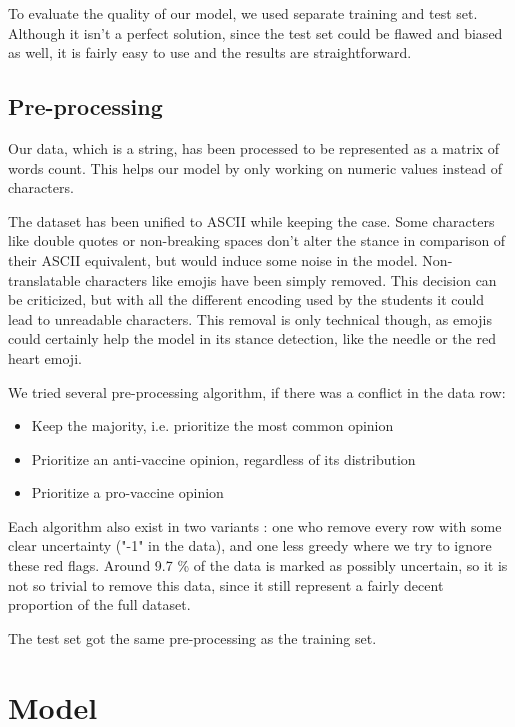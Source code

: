 \documentclass[11pt]{article}
\begin{document}
To evaluate the quality of our model, we used separate training and test set.
Although it isn't a perfect solution, since the test set could be flawed and biased as well,
it is fairly easy to use and the results are straightforward.

\subsection{Pre-processing}

Our data, which is a string, has been processed to be represented as a matrix of words count.
This helps our model by only working on numeric values instead of characters.

The dataset has been unified to ASCII while keeping the case.
Some characters like double quotes or non-breaking spaces don't alter the stance in comparison of their ASCII equivalent,
but would induce some noise in the model.
Non-translatable characters like emojis have been simply removed.
This decision can be criticized, but with all the different encoding used by the students it could lead to unreadable characters.
This removal is only technical though, as emojis could certainly help the model in its stance detection,
like the needle or the red heart emoji.

We tried several pre-processing algorithm, if there was a conflict in the data row:

\begin{itemize}
\item Keep the majority, i.e. prioritize the most common opinion
\item Prioritize an anti-vaccine opinion, regardless of its distribution
\item Prioritize a pro-vaccine opinion
\end{itemize}

Each algorithm also exist in two variants : one who remove every row with some clear uncertainty ("-1" in the data),
and one less greedy where we try to ignore these red flags.
Around 9.7 \% of the data is marked as possibly uncertain, so it is not so trivial to remove this data,
since it still represent a fairly decent proportion of the full dataset.

The test set got the same pre-processing as the training set.

\section{Model}
\end{document}
